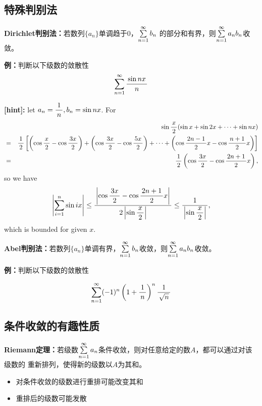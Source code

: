\begin{shaded}

\subsection{特殊判别法}

{\bf Dirichlet判别法：}若数列$\{a_n\}$单调趋于$0$，$\sumn b_n$
  的部分和有界，则$\sumn a_nb_n$收敛。
  
{\bf 例：}判断以下级数的敛散性
$$\sumn\df{\sin nx}n$$

{\bf [hint]:}
let $a_n=\df1n,b_n=\sin nx$. For
\begin{eqnarray*}
&&\sin\df x2(\sin x+\sin2x+\cdots+\sin nx)\\
&=&\df12\left[\left(\cos\df x2-\cos\df{3x}2\right)+
\left(\cos\df {3x}2-\cos\df{5x}2\right)+\cdots+
\left(\cos\df {2n-1}2x-\cos\df{n+1}2x\right)\right]\\
&=&\df12\left(\cos\df{3x}2-\cos\df{2n+1}2x\right),
\end{eqnarray*}
so we have
$$\left|\sum\limits_{i=1}^n\sin ix\right|
\leq\df{\left|\cos\df{3x}2-\cos\df{2n+1}2x\right|}{2\left|\sin\df x2\right|}
\leq\df1{\left|\sin\df x2\right|},$$
which is bounded for given $x$.

{\bf Abel判别法：}若数列$\{a_n\}$单调有界，$\sumn b_n$收敛，则$\sumn a_nb_n$收敛。

{\bf 例：}判断以下级数的敛散性

$$\sumn(-1)^n\left(1+\df 1n\right)^n\df{1}{\sqrt n}$$ 

\subsection{条件收敛的有趣性质}

{\bf Riemann定理：}若级数$\sumn a_n$条件收敛，则对任意给定的数$A$，都可以通过对该级数的
重新排列，使得新的级数以$A$为其和。

\begin{itemize}
  \item 对条件收敛的级数进行重排可能改变其和
  \item 重排后的级数可能发散
\end{itemize}

\end{shaded}

